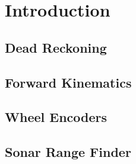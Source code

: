 \documentclass[main.tex]{subfiles}
\begin{document}
\section{Introduction}

\subsection{Dead Reckoning}

\subsection{Forward Kinematics}

\subsection{Wheel Encoders}

\subsection{Sonar Range Finder}
\end{document}
